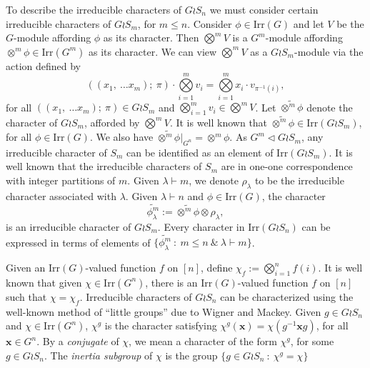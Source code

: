 \documentclass{amsart}
\theoremstyle{plain}
\theoremstyle{remark}\newtheorem{con}[theorem]{Construction}
\theoremstyle{remark} \newtheorem*{remark}{Remark}
\theoremstyle{remark} \newtheorem{example}{Example}
\newcommand{\mbf}{\mathbf}
\newcommand{\irr}{\mathrm{Irr}}
\begin{document}
To describe the irreducible characters of $G \wr S_{n}$ we must  consider  certain irreducible characters of $G\wr S_{m}$, for $m\leq n$. 
Consider $\phi \in \irr(G)$ and let $V$ be the $G$-module affording $\phi$ as its character. Then $\bigotimes^{m} V$ is a $G^{m}$-module affording $\otimes^{m} \phi \in \irr(G^{m})$ as its character. We can view $\bigotimes^{m} V$ as a $G\wr S_{m}$-module via the action defined by
\[((x_{1},\ \ldots x_{m});\ \pi)\cdot \bigotimes\limits_{i=1}^{m} v_{i} = \bigotimes\limits_{i=1}^{m} x_{i}\cdot v_{\pi^{-1}(i)},\] for all $((x_{1},\ \ldots x_{m});\ \pi)\in G \wr S_{m}$ and $\bigotimes\limits_{i=1}^{m} v_{i} \in \bigotimes^{m} V$. Let $\widetilde{\otimes^{m}\phi}$ denote the character of $G \wr S_{m}$, afforded by $\bigotimes^{m}V$.  It is well known that $\widetilde{\otimes^{m} \phi} \in \irr(G \wr S_{m})$, for all $\phi \in \irr(G)$. We also have $\widetilde{\otimes^{m} \phi}|_{G^{n}}= \otimes^{m} \phi$. As $G^{m} \lhd G \wr S_{m}$, any irreducible character of $S_{m}$ can be identified as an element of $\irr(G \wr S_{m})$. It is well known that the irreducible characters of $S_{m}$ are in one-one correspondence with integer partitions of $m$. Given $\lambda \vdash m$, we denote $\rho_{\lambda}$ to be the irreducible character associated with $\lambda$. 
Given $\lambda \vdash n$ and $\phi \in \irr(G)$, the  character 
\begin{equation}\label{eq:primitive}
\widetilde{\phi^{m}_{\lambda}}:= \widetilde{\otimes ^{m} \phi} \otimes \rho_{\lambda},
\end{equation}
is an irreducible character of $G \wr S_{m}$. Every character in $\irr(G\wr S_{n})$ can be expressed in terms of elements of $\{\widetilde{\phi^{m}_{\lambda}} \ : \ m \leq n\ \&\ \lambda\vdash m\}$.

Given an $\irr(G)$-valued function $f$ on $[n]$, define $\chi_{f}:= \bigotimes\limits_{i=1}^{n} f(i)$. It is well known that given $\chi\in \irr(G^{n})$, there is an $\irr(G)$-valued function $f$ on $[n]$ such that $\chi =\chi_{f}$. Irreducible characters of $G\wr S_{n}$ can be characterized using the well-known method of ``little groups'' due to Wigner and Mackey. Given $g \in G\wr S_{n}$ and $\chi\in \irr(G^{n})$, $\chi^{g}$ is the character satisfying $\chi^{g}(\mbf{x})=\chi(g^{-1}\mbf{x}g)$, for all $\mbf{x}\in G^{n}$. By a {\it conjugate} of $\chi$, we mean a character of the form $\chi^{g}$, for some $g\in G\wr S_{n}$. The {\it inertia subgroup} of $\chi$ is the group $\{g \in G\wr S_{n}\ :\ \chi^{g}=\chi\}$
\end{document}
